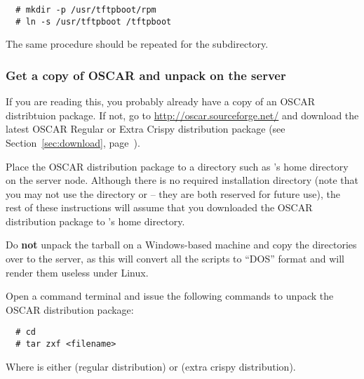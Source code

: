 \begin{verbatim}
  # mkdir -p /usr/tftpboot/rpm
  # ln -s /usr/tftpboot /tftpboot
\end{verbatim}

The same procedure should be repeated for the
 subdirectory.

    
\subsubsection{Get a copy of OSCAR and unpack on the server} 
\label{det:unpack}

If you are reading this, you probably already have a copy of an OSCAR
distribtuion package.  If not, go to
\url{http://oscar.sourceforge.net/} and download the latest OSCAR
Regular or Extra Crispy distribution package (see
Section~\ref{sec:download}, page~\pageref{sec:download}).

Place the OSCAR distribution package to a directory such as
's home directory on the server node.  Although there is no
required installation directory (note that you may not use the
directory  or  -- they are
both reserved for future use), the rest of these instructions will
assume that you downloaded the OSCAR distribution package to
's home directory.

Do {\bf not} unpack the tarball on a Windows-based machine and copy
the directories over to the server, as this will convert all the
scripts to ``DOS'' format and will render them useless under Linux.

Open a command terminal and issue the following commands to unpack the
OSCAR distribution package:

\begin{verbatim}
  # cd
  # tar zxf <filename>
\end{verbatim}

Where  is either
 (regular distribution) or
 (extra crispy
distribution).

\def\obase{$^\sim$/oscar-\oscarversion}

